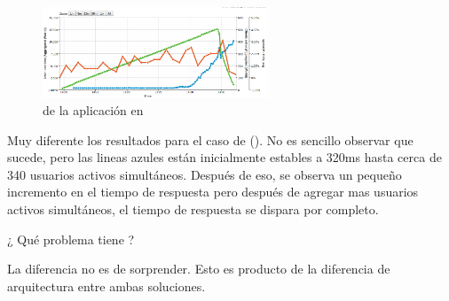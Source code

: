 

\begin{figure}[h!]
	\centering
	\includegraphics[width=0.6\textwidth]{figuras/cap2/phpapache_benchmak_loadimpact.png}
	\caption{\performanceQA de la aplicación en \phpApacheNAME}
	\label{figure:php_benchmark_nodephp}
\end{figure}

Muy diferente los resultados para el caso de \phpNAME(). No es sencillo observar que sucede, pero las lineas azules están inicialmente estables a 320ms hasta cerca de 340 usuarios activos simultáneos. Después de eso, se observa un pequeño incremento en el tiempo de respuesta pero después de agregar mas usuarios activos simultáneos, el tiempo de respuesta se dispara por completo. 

¿ Qué problema tiene \phpApacheNAME?

La diferencia no es de sorprender. Esto es producto de la diferencia de arquitectura entre ambas soluciones.

